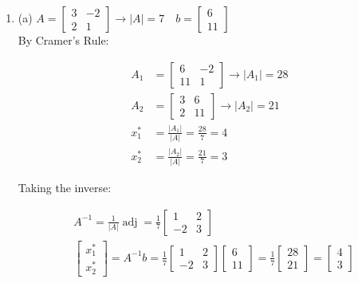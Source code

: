 \begin{enumerate}
\item[1 \& 2.]  
(a) $A=\left[\begin{array}{cc}3 & -2 \\ 2 & 1\end{array}\right] \rightarrow|A|=7 \quad b=\left[\begin{array}{c}6 \\ 11\end{array}\right]$ \\

By Cramer's Rule:

\[
\begin{aligned}
A_{1} & =\left[\begin{array}{rr}
6 & -2 \\
11 & 1
\end{array}\right] \rightarrow\left|A_{1}\right|=28 \\
A_{2} & =\left[\begin{array}{ll}
3 & 6 \\
2 & 11
\end{array}\right] \rightarrow\left|A_{2}\right|=21 \\
x_{1}^{*} & =\frac{\left|A_{1}\right|}{|A|}=\frac{28}{7}=4 \\
x_{2}^{*} & =\frac{\left|A_{2}\right|}{|A|}=\frac{21}{7}=3
\end{aligned}
\]

Taking the inverse:

\[
\begin{aligned}
& A^{-1}=\frac{1}{|A|} \operatorname{adj}=\frac{1}{7}\left[\begin{array}{cc}1 & 2 \\-2 & 3\end{array}\right] \\
& \left[\begin{array}{l}x_{1}^{*} \\x_{2}^{*}\end{array}\right]=A^{-1} b=\frac{1}{7}\left[\begin{array}{rr}1 & 2 \\-2 & 3\end{array}\right]\left[\begin{array}{l}6 \\11\end{array}\right]=\frac{1}{7}\left[\begin{array}{l}28 \\21\end{array}\right]=\left[\begin{array}{l}4 \\3\end{array}\right] 
\end{aligned}
\]


\end{enumerate}
